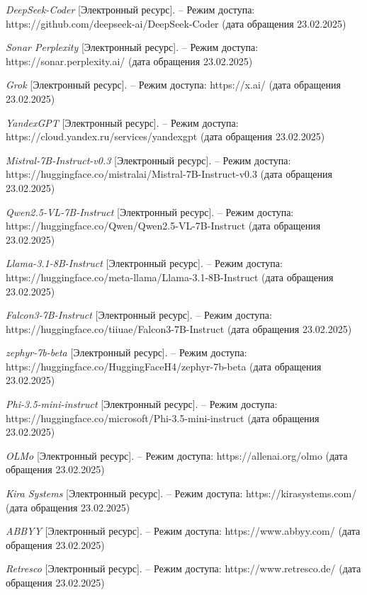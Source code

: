 \begin{thebibliography}{}
	\textit{DeepSeek-Coder} [Электронный ресурс]. --
	Режим доступа: https://github.com/deepseek-ai/DeepSeek-Coder (дата обращения 23.02.2025)

	\textit{Sonar Perplexity} [Электронный ресурс]. --
	Режим доступа: https://sonar.perplexity.ai/ (дата обращения 23.02.2025)

	\textit{Grok} [Электронный ресурс]. --
	Режим доступа: https://x.ai/ (дата обращения 23.02.2025)

	\textit{YandexGPT} [Электронный ресурс]. --
	Режим доступа: https://cloud.yandex.ru/services/yandexgpt (дата обращения 23.02.2025)

	\textit{Mistral-7B-Instruct-v0.3} [Электронный ресурс]. --
	Режим доступа: https://huggingface.co/mistralai/Mistral-7B-Instruct-v0.3 (дата обращения 23.02.2025)

	\textit{Qwen2.5-VL-7B-Instruct} [Электронный ресурс]. --
	Режим доступа: https://huggingface.co/Qwen/Qwen2.5-VL-7B-Instruct (дата обращения 23.02.2025)

	\textit{Llama-3.1-8B-Instruct} [Электронный ресурс]. --
	Режим доступа: https://huggingface.co/meta-llama/Llama-3.1-8B-Instruct (дата обращения 23.02.2025)

	\textit{Falcon3-7B-Instruct} [Электронный ресурс]. --
	Режим доступа: https://huggingface.co/tiiuae/Falcon3-7B-Instruct (дата обращения 23.02.2025)

	\textit{zephyr-7b-beta} [Электронный ресурс]. --
	Режим доступа: https://huggingface.co/HuggingFaceH4/zephyr-7b-beta (дата обращения 23.02.2025)

	\textit{Phi-3.5-mini-instruct} [Электронный ресурс]. --
	Режим доступа: https://huggingface.co/microsoft/Phi-3.5-mini-instruct (дата обращения 23.02.2025)

	\textit{OLMo} [Электронный ресурс]. --
	Режим доступа: https://allenai.org/olmo (дата обращения 23.02.2025)

	\textit{Kira Systems} [Электронный ресурс]. --
	Режим доступа: https://kirasystems.com/ (дата обращения 23.02.2025)

	\textit{ABBYY} [Электронный ресурс]. --
	Режим доступа: https://www.abbyy.com/ (дата обращения 23.02.2025)

	\textit{Retresco} [Электронный ресурс]. --
	Режим доступа: https://www.retresco.de/ (дата обращения 23.02.2025)


\end{thebibliography}
